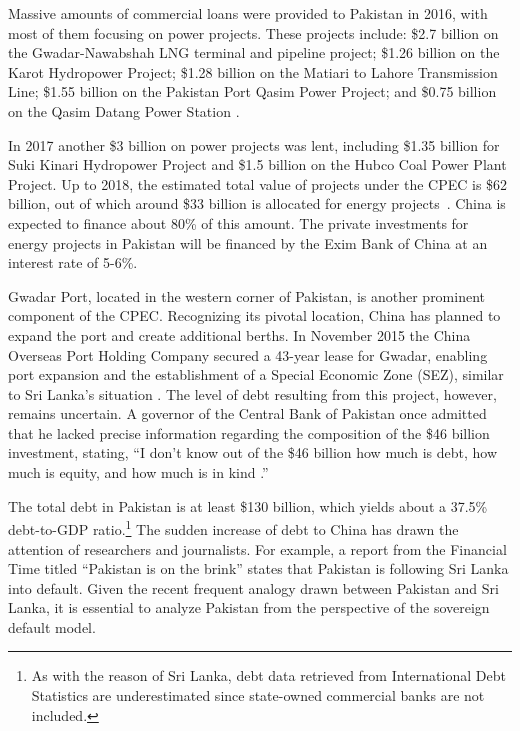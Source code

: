 Massive amounts of commercial loans were provided to Pakistan in 2016, with most of them focusing on power projects.
These projects include:
\$2.7 billion on the Gwadar-Nawabshah LNG terminal and pipeline project;
\$1.26 billion on the Karot Hydropower Project;
\$1.28 billion on the Matiari to Lahore Transmission Line;
\$1.55 billion on the Pakistan Port Qasim Power Project; and \$0.75 billion on the Qasim Datang Power Station \citep*{Horn-Reinhart-Trebesch-21}.

In 2017 another \$3 billion on power projects was lent, including \$1.35 billion for Suki Kinari Hydropower Project and \$1.5 billion on the Hubco Coal Power Plant Project.
Up to 2018, the estimated total value of projects under the CPEC is \$62 billion, out of which around \$33 billion is allocated for energy projects~\citep*{Hurley19-8-debt-trap}. China is expected to finance about 80\% of this amount. The private investments for energy projects in Pakistan will be financed by the Exim Bank of China at an interest rate of 5-6\%.

Gwadar Port, located in the western corner of Pakistan, is another prominent component of the CPEC.
Recognizing its pivotal location, China has planned to expand the port and create additional berths. In November 2015 the China Overseas Port Holding Company secured a 43-year lease for Gwadar, enabling port expansion and the establishment of a Special Economic Zone (SEZ), similar to Sri Lanka's situation \citep{Ranade-17-CPEC}.
The level of debt resulting from this project, however, remains uncertain. A governor of the Central Bank of Pakistan once admitted that he lacked precise information regarding the composition of the \$46 billion investment, stating, ``I don't know out of the \$46 billion how much is debt, how much is equity, and how much is in kind \citep{small2020returning}.''

The total debt in Pakistan is at least \$130 billion, which yields about a 37.5\% debt-to-GDP ratio.\footnote{
    As with the reason of Sri Lanka, debt data retrieved from International Debt Statistics are underestimated since state-owned commercial banks are not included.
}
The sudden increase of debt to China has drawn the attention of researchers and journalists. For example, a report from the Financial Time titled ``Pakistan is on the brink'' states that Pakistan is following Sri Lanka into default.
Given the recent frequent analogy drawn between Pakistan and Sri Lanka, it is essential to analyze Pakistan from the perspective of the sovereign default model.
